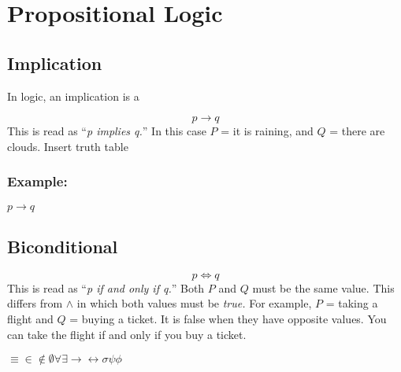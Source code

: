 \section{Propositional Logic}


\subsection{Implication}
In logic, an \gls{implication} is a 


\begin{equation}p \to q \end{equation}
This is read as ``\textit{p implies q.}'' In this case $P$ = it is raining, 
and $Q$ = there are clouds. 
Insert truth table
\subsubsection{Example:}
$p \to q$
\subsection{Biconditional}
\begin{equation}
p \iff q \end{equation}
This is read as ``\textit{p if and only if q.}'' Both $P$ and $Q$ must be the
same value. This differs from $\wedge$ in which both values must be
\textit{true.} For example, $P$ = taking a flight and $Q$ = buying a ticket. It
is false when they have opposite values. You can take the flight if and only if
you buy a ticket.

$\equiv \in \notin \emptyset \forall \exists \rightarrow \leftrightarrow \sigma
\psi \phi $


